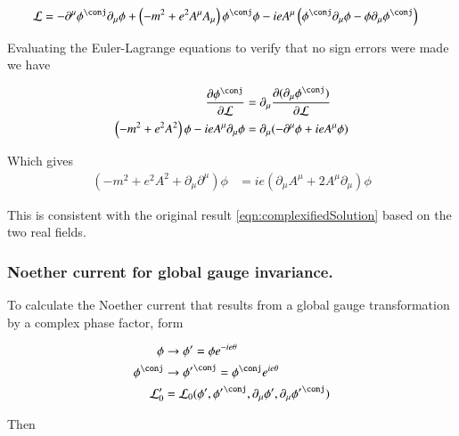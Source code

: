 \documentclass{article}
\begin{document}
\begin{align}\label{eqn:densityComplex}
\LL 
&=
-\partial^\mu \phi^\conj \partial_\mu \phi
+ \left( -m^2 + e^2 A^\mu A_\mu \right) \phi^\conj \phi
- i e A^\mu \left( \phi^\conj \partial_\mu \phi - \phi \partial_\mu \phi^\conj \right)
\end{align}

Evaluating the Euler-Lagrange equations to verify that no sign errors were made we have

\begin{align*}
\PD{\phi^\conj}{\LL}
&=
\partial_\mu \PD{(\partial_\mu \phi^\conj)}{\LL} \\
\left( -m^2 + e^2 A^2 \right) \phi 
- i e A^\mu \partial_\mu \phi
&=
\partial_\mu (-\partial^\mu \phi + i e A^\mu \phi) \\
\end{align*}

Which gives
\begin{align}
\left( -m^2 + e^2 A^2 + \partial_\mu \partial^\mu \right) \phi &= i e (\partial_\mu A^\mu + 2 A^\mu \partial_\mu) \phi
\end{align}

This is consistent with the original result \ref{eqn:complexifiedSolution} based on the two real fields.

\subsubsection{ Noether current for global gauge invariance. }

To calculate the Noether current that results from a global gauge transformation by a complex phase factor, form

\begin{align*}
\phi &\rightarrow \phi' = \phi e^{-i e \theta} \\
\phi^\conj &\rightarrow {\phi'}^\conj = \phi^\conj e^{i e \theta} \\
\LL_0' &= \LL_0( \phi', {\phi'}^\conj, \partial_\mu \phi', \partial_\mu {\phi'}^\conj )
\end{align*}

Then 
\end{document}
